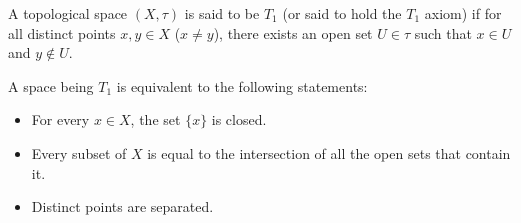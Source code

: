 \documentclass[12pt]{article}
\begin{document}
A topological space $(X,\tau)$ is said to be $T_1$ (or said to hold the $T_1$ axiom) if for all distinct points $x,y\in X$ ($x\neq y$), there exists an open set $U\in\tau$ such that $x\in U$ and $y\notin U$.

A space being $T_1$ is equivalent to the following statements:
\begin{itemize}
\item For every $x\in X$, the set $\{x\}$ is closed.
\item Every subset of $X$ is equal to the intersection of all the open sets that contain it.
\item Distinct points are separated.
\end{itemize}
\end{document}
